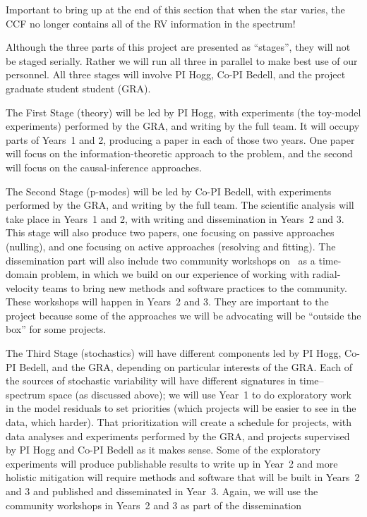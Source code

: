 \documentclass[12pt, letterpaper]{article}
\begin{document}

Important to bring up at the end of this section that when the star
varies, the CCF no longer contains all of the RV information in the
spectrum!




Although the three parts of this project are presented as ``stages'',
they will not be staged serially.
Rather we will run all three in parallel to make best use of our
personnel.
All three stages will involve PI Hogg, Co-PI Bedell, and the project
graduate student student (GRA). 

The First Stage (theory) will be led by PI Hogg, with experiments (the
toy-model experiments) performed by the GRA, and writing by the full
team.
It will occupy parts of Years~1 and 2, producing a paper
in each of those two years.
One paper will focus on the information-theoretic approach to the problem,
and the second will focus on the causal-inference approaches.

The Second Stage (p-modes) will be led by Co-PI Bedell, with
experiments performed by the GRA, and writing by the full team.
The scientific analysis will take place in Years~1 and 2, with
writing and dissemination in Years~2 and 3.
This stage will also produce two papers, one focusing on passive
approaches (nulling), and one focusing on active approaches (resolving
and fitting).
The dissemination part will also include two community workshops on
\EPRV\ as a time-domain problem, in which we build on our experience
of working with radial-velocity teams to bring new methods and
software practices to the community.
These workshops will happen in Years~2 and 3.
They are important to the project because some of the approaches we
will be advocating will be ``outside the box'' for some projects.

The Third Stage (stochastics) will have different components led by PI
Hogg, Co-PI Bedell, and the GRA, depending on particular interests of
the GRA.
Each of the sources of stochastic variability will have different
signatures in time--spectrum space (as discussed above); we will use
Year~1 to do exploratory work in the model residuals to set priorities
(which projects will be easier to see in the data, which harder).
That prioritization will create a schedule for projects, with data
analyses and experiments performed by the GRA, and projects supervised
by PI Hogg and Co-PI Bedell as it makes sense.
Some of the exploratory experiments will produce publishable results
to write up in Year~2 and more holistic mitigation will require
methods and software that will be built in Years~2 and 3 and published
and disseminated in Year~3.
Again, we will use the community workshops in Years~2 and 3 as part of
the dissemination
\end{document}
